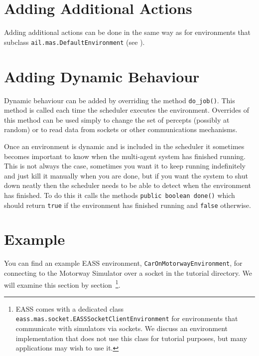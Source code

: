 \section{Adding Additional Actions}
Adding additional actions can be done in the same way as for environments that subclass \texttt{ail.mas.DefaultEnvironment} (see ).

\section{Adding Dynamic Behaviour}

Dynamic behaviour can be added by overriding the method \texttt{do\_job()}.  This method is called each time the scheduler executes the environment.  Overrides of this method can be used simply to change the set of percepts (possibly at random) or to read data from sockets or other communications mechanisms.

Once an environment is dynamic and is included in the scheduler it sometimes becomes important to know when the multi-agent system has finished running.  This is not always the case, sometimes you want it to keep running indefinitely and just kill it manually when you are done, but if you want the system to shut down neatly then the scheduler needs to be able to detect when the environment has finished.  To do this it calls the methods \texttt{public boolean done()} which should return \texttt{true} if the environment has finished running and \texttt{false} otherwise.

\section{Example}
You can find an example EASS environment, \texttt{CarOnMotorwayEnvironment}, for connecting to the Motorway Simulator over a socket in the tutorial directory.  We will examine this section by section~\footnote{EASS comes with a dedicated class \texttt{eass.mas.socket.EASSSocketClientEnvironment} for environments that communicate with simulators via sockets.  We discuss an environment implementation that does not use this class for tutorial purposes, but many applications may wish to use it.}.

